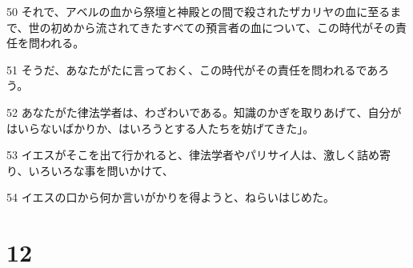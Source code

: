 \par 50 それで、アベルの血から祭壇と神殿との間で殺されたザカリヤの血に至るまで、世の初めから流されてきたすべての預言者の血について、この時代がその責任を問われる。
\par 51 そうだ、あなたがたに言っておく、この時代がその責任を問われるであろう。
\par 52 あなたがた律法学者は、わざわいである。知識のかぎを取りあげて、自分がはいらないばかりか、はいろうとする人たちを妨げてきた」。
\par 53 イエスがそこを出て行かれると、律法学者やパリサイ人は、激しく詰め寄り、いろいろな事を問いかけて、
\par 54 イエスの口から何か言いがかりを得ようと、ねらいはじめた。

\chapter{12}

